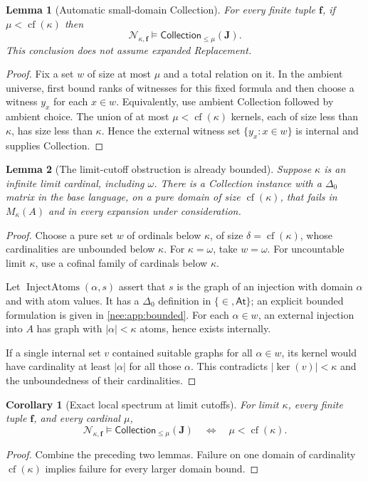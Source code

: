 \documentclass[11pt,letterpaper]{article}
\numberwithin{equation}{section}
\theoremstyle{plain}
\newtheorem{lemma}[lemma]{Lemma}
\newtheorem{corollary}[corollary]{Corollary}
\theoremstyle{definition}
\theoremstyle{remark}
\newcommand{\At}{\mathsf{At}}
\newcommand{\Coll}{\mathsf{Collection}}
\newcommand{\cf}{\operatorname{cf}}
\newcommand{\kerat}{\operatorname{ker}}
\begin{document}
\begin{lemma}[Automatic small-domain Collection]\label{nee:lem:smallcoll}
For every finite tuple $\boldsymbol f$, if $\mu<\cf(\kappa)$ then
\[
\mathcal N_{\kappa,\boldsymbol f}\models\Coll_{\leq\mu}(\boldsymbol J).
\]
This conclusion does not assume expanded Replacement.
\end{lemma}
\begin{proof}
Fix a set $w$ of size at most $\mu$ and a total relation on it. In the ambient universe, first bound ranks of witnesses for this fixed formula and then choose a witness $y_x$ for each $x\in w$. Equivalently, use ambient Collection followed by ambient choice. The union of at most $\mu<\cf(\kappa)$ kernels, each of size less than $\kappa$, has size less than $\kappa$. Hence the external witness set $\{y_x:x\in w\}$ is internal and supplies Collection.
\end{proof}

\begin{lemma}[The limit-cutoff obstruction is already bounded]\label{nee:lem:limitcoll}
Suppose $\kappa$ is an infinite limit cardinal, including $\omega$. There is a Collection instance with a $\Delta_0$ matrix in the base language, on a pure domain of size $\cf(\kappa)$, that fails in $M_\kappa(A)$ and in every expansion under consideration.
\end{lemma}
\begin{proof}
Choose a pure set $w$ of ordinals below $\kappa$, of size $\delta=\cf(\kappa)$, whose cardinalities are unbounded below $\kappa$. For $\kappa=\omega$, take $w=\omega$. For uncountable limit $\kappa$, use a cofinal family of cardinals below $\kappa$.

Let $\operatorname{InjectAtoms}(\alpha,s)$ assert that $s$ is the graph of an injection with domain $\alpha$ and with atom values. It has a $\Delta_0$ definition in $\{\in,\At\}$; an explicit bounded formulation is given in \cref{nee:app:bounded}. For each $\alpha\in w$, an external injection into $A$ has graph with $|\alpha|<\kappa$ atoms, hence exists internally.

If a single internal set $v$ contained suitable graphs for all $\alpha\in w$, its kernel would have cardinality at least $|\alpha|$ for all those $\alpha$. This contradicts $|\kerat(v)|<\kappa$ and the unboundedness of their cardinalities.
\end{proof}

\begin{corollary}[Exact local spectrum at limit cutoffs]\label{nee:cor:limitspectrum}
For limit $\kappa$, every finite tuple $\boldsymbol f$, and every cardinal $\mu$,
\[
\mathcal N_{\kappa,\boldsymbol f}\models\Coll_{\leq\mu}(\boldsymbol J)
\quad\Longleftrightarrow\quad \mu<\cf(\kappa).
\]
\end{corollary}
\begin{proof}
Combine the preceding two lemmas. Failure on one domain of cardinality $\cf(\kappa)$ implies failure for every larger domain bound.
\end{proof}
\end{document}
